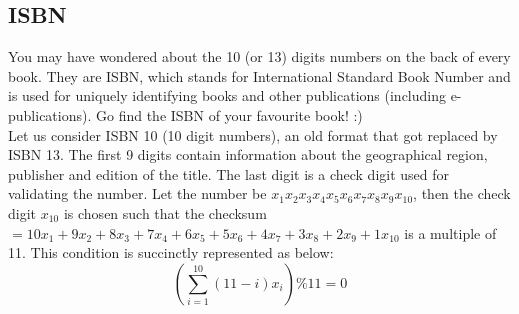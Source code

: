 \documentclass[../../Problems]{subfiles}
\begin{document}
\subsection{ISBN}
You may have wondered about the 10 (or 13) digits numbers on the back of every book. They are ISBN, which stands for International Standard Book Number and is used for uniquely identifying books and other publications (including e-publications). Go find the ISBN of your favourite book! :)\\
Let us consider ISBN 10 (10 digit numbers), an old format that got replaced by ISBN 13.
The first 9 digits contain information about the geographical region, publisher and edition of the title. The last digit is a check digit used for validating the number.
Let the number be $x_1x_2x_3x_4x_5x_6x_7x_8x_9x_{10}$, then the check digit $x_{10}$ is chosen such that the checksum $= 10x_1 + 9x_2 + 8x_3 + 7x_4 + 6x_5 + 5x_6 + 4x_7 + 3x_8 + 2x_9 + 1x_{10}$ is a multiple of 11.
This condition is succinctly represented as below:
\begin{equation}
{\displaystyle \left(\sum _{i=1}^{10}(11-i)x_{i} \right) \% 11 = 0}
\end{equation}
\end{document}
